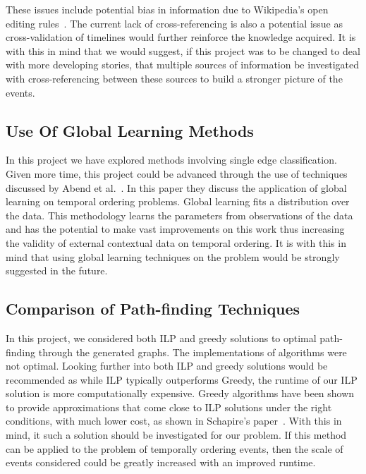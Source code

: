 \documentclass[bsc,frontabs,twoside,singlespacing,parskip,deptreport]{infthesis}     %
\begin{document}
These issues include potential bias in information due to Wikipedia's open editing rules~\cite{wikipediaeditrules}. The current lack of
cross-referencing is also a potential issue as cross-validation of timelines would further reinforce the knowledge acquired.
It is with this in mind that we would suggest, if this project was to be changed to deal with more developing stories, that
multiple sources of information be investigated with cross-referencing between these sources to build a stronger picture of
the events.


\subsection{Use Of Global Learning Methods}
In this project we have explored methods involving single edge classification. Given more time,
this project could be advanced through the use of techniques discussed by Abend et al.~\cite{abend2015lexical}.
In this paper they discuss the application of global learning on temporal ordering problems. Global learning
fits a distribution over the data. This methodology learns the parameters from observations of the data~\cite{Huang2008}
and has the potential to make vast improvements on this work thus increasing the validity
of external contextual data on temporal ordering. It is with this in mind that using global learning techniques on the problem
would be strongly suggested in the future.

\subsection{Comparison of Path-finding Techniques}
In this project, we considered both ILP and greedy solutions to optimal path-finding through the generated graphs.
The implementations of algorithms were not optimal. Looking further into both ILP and greedy solutions would
be recommended as while ILP typically outperforms Greedy, the runtime of our ILP solution is more computationally
expensive. Greedy algorithms have been shown to provide approximations that come close to ILP solutions under the right
conditions, with much lower cost, as shown in Schapire's paper~\cite{schapire1998learning}. With this in mind,
it such a solution should be investigated for our problem. If this method can
be applied to the problem of temporally ordering events, then the scale of events considered could be greatly increased with
an improved runtime.

\end{document}
